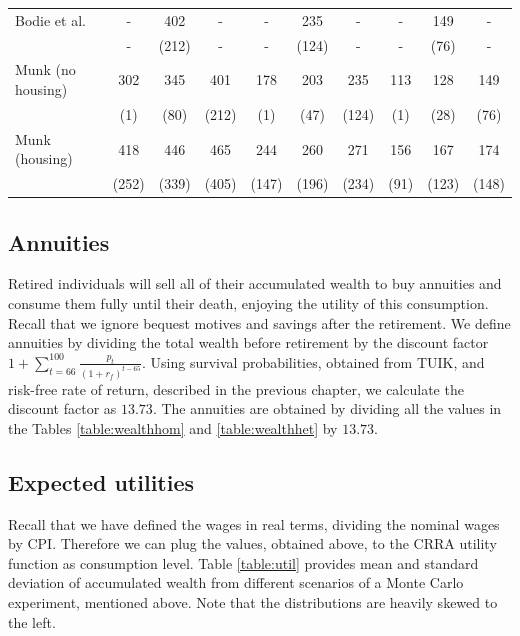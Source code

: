 \documentclass[]{elsarticle}
\begin{document}
\begin{table}[h!]
\begin{tabular}[c]{|l|ccc|ccc|ccc|}
		\hline
Bodie et al.			 	&-&  402&-&-&  235&-&-& 149&- \\
							&-&  (212)&-&-&  (124)&-&-&  (76)&- \\
Munk (no housing)			&  302&  345&  401&  178&  203&  235&  113&  128&  149\\
							&    (1)&   (80)&  (212)&    (1)&   (47)&  (124)&    (1)&   (28)&   (76)\\
Munk (housing)				&  418&  446&  465&  244&  260&  271&  156&  167&  174\\
							&  (252)&  (339)&  (405)&  (147)&  (196)&  (234)&   (91)&  (123)&  (148)\\
	\hline
	\end{tabular}
\end{table}


\subsection{Annuities}

Retired individuals will sell all of their accumulated wealth to buy annuities and consume them fully until their death, enjoying the utility of this consumption. Recall that we ignore bequest motives and savings after the retirement. We define annuities by dividing the total wealth before retirement by the discount factor $1 + \sum^{100}_{t=66}\frac{p_t}{(1+r_f)^{t-65}}$. Using survival probabilities, obtained from TUIK, and risk-free rate of return, described in the previous chapter, we calculate the discount factor as $13.73$. The annuities are obtained by dividing all the values in the Tables \ref{table:wealthhom} and \ref{table:wealthhet} by $13.73$. 


\subsection{Expected utilities}
Recall that we have defined the wages in real terms, dividing the nominal wages by CPI. Therefore we can plug the values, obtained above, to the CRRA utility function as consumption level. Table \ref{table:util} provides mean and standard deviation of accumulated wealth from different scenarios of a Monte Carlo experiment, mentioned above. Note that the distributions are heavily skewed to the left.
\end{document}
